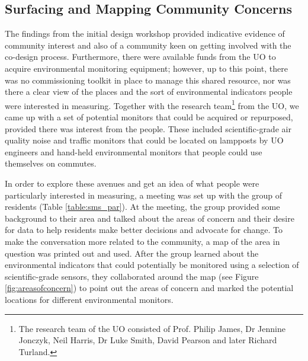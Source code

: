 \subsection{Surfacing and Mapping Community Concerns}
The findings from the initial design workshop provided indicative evidence of community interest and also of a community keen on getting involved with the co-design process. Furthermore, there were available funds from the UO to acquire environmental monitoring equipment; however, up to this point, there was no commissioning toolkit in place to manage this shared resource, nor was there a clear view of the places and the sort of environmental indicators people were interested in measuring. Together with the research team\footnote{The research team of the UO consisted of Prof. Philip James, Dr Jennine Jonczyk, Neil Harris, Dr Luke Smith, David Pearson and later Richard Turland.} from the UO, we came up with a set of potential monitors that could be acquired or repurposed, provided there was interest from the people. These included scientific-grade air quality noise and traffic monitors that could be located on lampposts by UO engineers and hand-held environmental monitors that people could use themselves on commutes.

In order to explore these avenues and get an idea of what people were particularly interested in measuring, a meeting was set up with the group of residents (Table \ref{table:sms_par}). At the meeting, the group provided some background to their area and talked about the areas of concern and their desire for data to help residents make better decisions and advocate for change. To make the conversation more related to the community, a map of the area in question was printed out and used. After the group learned about the environmental indicators that could potentially be monitored using a selection of scientific-grade sensors, they collaborated around the map (see Figure \ref{fig:areasofconcern}) to point out the areas of concern and marked the potential locations for different environmental monitors.

